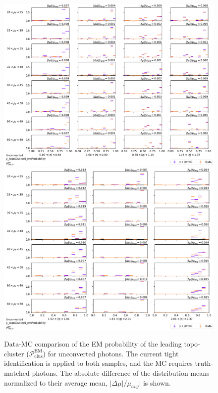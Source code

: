 \begin{figure}[!thp]
    \centering
    \includegraphics[width=.74\textwidth]{appendices/datamc_images/y_topoCluster0_emProbability_Unconverted_lowerEta.pdf}
    \includegraphics[width=.74\textwidth]{appendices/datamc_images/y_topoCluster0_emProbability_Unconverted_upperEta.pdf}
    \caption[Data-MC comparison of the \gls{EM} probability of the leading topo-cluster ($\mathcal{P}_{\text{clus}}^{\text{EM}}$)or unconverted photons]{Data-MC comparison of the \gls{EM} probability of the leading topo-cluster ($\mathcal{P}_{\text{clus}}^{\text{EM}}$) for unconverted photons. The current tight identification is applied to both samples, and the \gls{MC} requires truth-matched photons. The absolute difference of the distribution means normalized to their average mean, $|\Delta \mu|/\mu_{avg}|$ is shown.}
    \label{fig:dmc-u-emp}
\end{figure}





